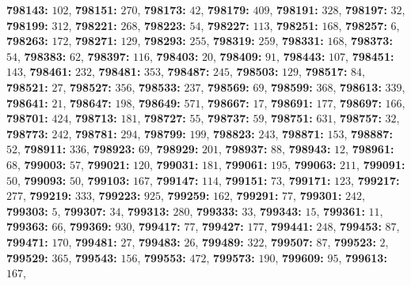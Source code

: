 \textsf{\bfseries 798143:} $102$, \textsf{\bfseries 798151:} $270$, \textsf{\bfseries 798173:} $42$, \textsf{\bfseries 798179:} $409$, \textsf{\bfseries 798191:} $328$, \textsf{\bfseries 798197:} $32$, \textsf{\bfseries 798199:} $312$, \textsf{\bfseries 798221:} $268$, \textsf{\bfseries 798223:} $54$, \textsf{\bfseries 798227:} $113$, \textsf{\bfseries 798251:} $168$, \textsf{\bfseries 798257:} $6$, \textsf{\bfseries 798263:} $172$, \textsf{\bfseries 798271:} $129$, \textsf{\bfseries 798293:} $255$, \textsf{\bfseries 798319:} $259$, \textsf{\bfseries 798331:} $168$, \textsf{\bfseries 798373:} $54$, \textsf{\bfseries 798383:} $62$, \textsf{\bfseries 798397:} $116$, \textsf{\bfseries 798403:} $20$, \textsf{\bfseries 798409:} $91$, \textsf{\bfseries 798443:} $107$, \textsf{\bfseries 798451:} $143$, \textsf{\bfseries 798461:} $232$, \textsf{\bfseries 798481:} $353$, \textsf{\bfseries 798487:} $245$, \textsf{\bfseries 798503:} $129$, \textsf{\bfseries 798517:} $84$, \textsf{\bfseries 798521:} $27$, \textsf{\bfseries 798527:} $356$, \textsf{\bfseries 798533:} $237$, \textsf{\bfseries 798569:} $69$, \textsf{\bfseries 798599:} $368$, \textsf{\bfseries 798613:} $339$, \textsf{\bfseries 798641:} $21$, \textsf{\bfseries 798647:} $198$, \textsf{\bfseries 798649:} $571$, \textsf{\bfseries 798667:} $17$, \textsf{\bfseries 798691:} $177$, \textsf{\bfseries 798697:} $166$, \textsf{\bfseries 798701:} $424$, \textsf{\bfseries 798713:} $181$, \textsf{\bfseries 798727:} $55$, \textsf{\bfseries 798737:} $59$, \textsf{\bfseries 798751:} $631$, \textsf{\bfseries 798757:} $32$, \textsf{\bfseries 798773:} $242$, \textsf{\bfseries 798781:} $294$, \textsf{\bfseries 798799:} $199$, \textsf{\bfseries 798823:} $243$, \textsf{\bfseries 798871:} $153$, \textsf{\bfseries 798887:} $52$, \textsf{\bfseries 798911:} $336$, \textsf{\bfseries 798923:} $69$, \textsf{\bfseries 798929:} $201$, \textsf{\bfseries 798937:} $88$, \textsf{\bfseries 798943:} $12$, \textsf{\bfseries 798961:} $68$, \textsf{\bfseries 799003:} $57$, \textsf{\bfseries 799021:} $120$, \textsf{\bfseries 799031:} $181$, \textsf{\bfseries 799061:} $195$, \textsf{\bfseries 799063:} $211$, \textsf{\bfseries 799091:} $50$, \textsf{\bfseries 799093:} $50$, \textsf{\bfseries 799103:} $167$, \textsf{\bfseries 799147:} $114$, \textsf{\bfseries 799151:} $73$, \textsf{\bfseries 799171:} $123$, \textsf{\bfseries 799217:} $277$, \textsf{\bfseries 799219:} $333$, \textsf{\bfseries 799223:} $925$, \textsf{\bfseries 799259:} $162$, \textsf{\bfseries 799291:} $77$, \textsf{\bfseries 799301:} $242$, \textsf{\bfseries 799303:} $5$, \textsf{\bfseries 799307:} $34$, \textsf{\bfseries 799313:} $280$, \textsf{\bfseries 799333:} $33$, \textsf{\bfseries 799343:} $15$, \textsf{\bfseries 799361:} $11$, \textsf{\bfseries 799363:} $66$, \textsf{\bfseries 799369:} $930$, \textsf{\bfseries 799417:} $77$, \textsf{\bfseries 799427:} $177$, \textsf{\bfseries 799441:} $248$, \textsf{\bfseries 799453:} $87$, \textsf{\bfseries 799471:} $170$, \textsf{\bfseries 799481:} $27$, \textsf{\bfseries 799483:} $26$, \textsf{\bfseries 799489:} $322$, \textsf{\bfseries 799507:} $87$, \textsf{\bfseries 799523:} $2$, \textsf{\bfseries 799529:} $365$, \textsf{\bfseries 799543:} $156$, \textsf{\bfseries 799553:} $472$, \textsf{\bfseries 799573:} $190$, \textsf{\bfseries 799609:} $95$, \textsf{\bfseries 799613:} $167$, 
